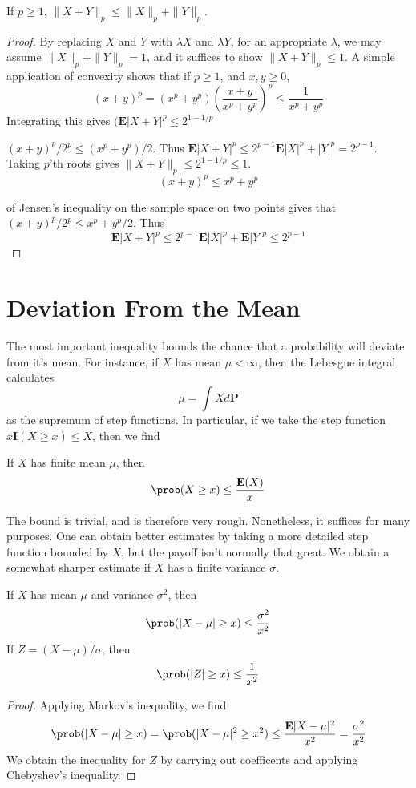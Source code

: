 \begin{corollary}
    If $p \geq 1$, $\| X + Y \|_p \leq \| X \|_p + \| Y \|_p$.
\end{corollary}
\begin{proof}
    By replacing $X$ and $Y$ with $\lambda X$ and $\lambda Y$, for an appropriate $\lambda$, we may assume $\| X \|_p + \| Y \|_p = 1$, and it suffices to show $\| X + Y \|_p \leq 1$. A simple application of convexity shows that if $p \geq 1$, and $x,y \geq 0$,
    \[ (x + y)^p = (x^p + y^p) \left( \frac{x + y}{x^p + y^p} \right)^p \leq \frac{1}{x^p + y^p} \]
    Integrating this gives $(\mathbf{E} |X + Y|^p \leq 2^{1-1/p}$

    $(x + y)^p/2^p \leq (x^p + y^p)/2$. Thus $\mathbf{E} |X+Y|^p \leq 2^{p-1} \mathbf{E} |X|^p + |Y|^p = 2^{p-1}$. Taking $p$'th roots gives $\| X + Y \|_p \leq 2^{1 - 1/p} \leq 1$. 
    \[ (x + y)^p \leq x^p + y^p \]

     of Jensen's inequality on the sample space on two points gives that $(x + y)^p / 2^p \leq x^p + y^p / 2$. Thus
    \[ \mathbf{E} |X + Y|^p \leq 2^{p-1}  \mathbf{E}|X|^p + \mathbf{E}|Y|^p \leq 2^{p-1} \]
\end{proof}

\section{Deviation From the Mean}

The most important inequality bounds the chance that a probability will deviate from it's mean. For instance, if $X$ has mean $\mu < \infty$, then the Lebesgue integral calculates
%
\[ \mu = \int X d\mathbf{P} \]
%
as the supremum of step functions. In particular, if we take the step function $x \mathbf{I}(X \geq x) \leq X$, then we find

\begin{theorem}
    If $X$ has finite mean $\mu$, then
    \[ \prob(X \geq x) \leq \frac{\mathbf{E}(X)}{x} \]
\end{theorem}

The bound is trivial, and is therefore very rough. Nonetheless, it suffices for many purposes. One can obtain better estimates by taking a more detailed step function bounded by $X$, but the payoff isn't normally that great. We obtain a somewhat sharper estimate if $X$ has a finite variance $\sigma$.

\begin{theorem}
    If $X$ has mean $\mu$ and variance $\sigma^2$, then
    \[ \prob(|X - \mu| \geq x) \leq \frac{\sigma^2}{x^2} \]
    If $Z = (X - \mu)/\sigma$, then
    \[ \prob(|Z| \geq x) \leq \frac{1}{x^2} \]
\end{theorem}
\begin{proof}
    Applying Markov's inequality, we find
    \[ \prob(|X - \mu| \geq x) = \prob(|X - \mu|^2 \geq x^2) \leq \frac{\mathbf{E}|X - \mu|^2}{x^2} = \frac{\sigma^2}{x^2} \]
    We obtain the inequality for $Z$ by carrying out coefficents and applying Chebyshev's inequality.
\end{proof}

